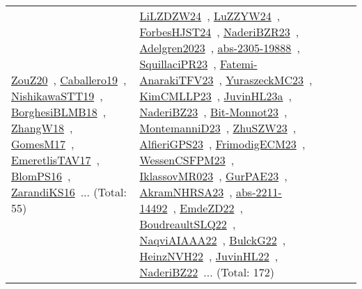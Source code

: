 {\begin{longtable}{lp{3cm}>{\raggedright\arraybackslash}p{6cm}>{\raggedright\arraybackslash}p{6cm}>{\raggedright\arraybackslash}p{8cm}}
\href{../works/ZouZ20.pdf}{ZouZ20}~\cite{ZouZ20}, \href{../works/Caballero19.pdf}{Caballero19}~\cite{Caballero19}, \href{../works/NishikawaSTT19.pdf}{NishikawaSTT19}~\cite{NishikawaSTT19}, \href{../works/BorghesiBLMB18.pdf}{BorghesiBLMB18}~\cite{BorghesiBLMB18}, \href{../works/ZhangW18.pdf}{ZhangW18}~\cite{ZhangW18}, \href{../works/GomesM17.pdf}{GomesM17}~\cite{GomesM17}, \href{../works/EmeretlisTAV17.pdf}{EmeretlisTAV17}~\cite{EmeretlisTAV17}, \href{../works/BlomPS16.pdf}{BlomPS16}~\cite{BlomPS16}, \href{../works/ZarandiKS16.pdf}{ZarandiKS16}~\cite{ZarandiKS16}... (Total: 55) & \href{../works/LiLZDZW24.pdf}{LiLZDZW24}~\cite{LiLZDZW24}, \href{../works/LuZZYW24.pdf}{LuZZYW24}~\cite{LuZZYW24}, \href{../works/ForbesHJST24.pdf}{ForbesHJST24}~\cite{ForbesHJST24}, \href{../works/NaderiBZR23.pdf}{NaderiBZR23}~\cite{NaderiBZR23}, \href{../works/Adelgren2023.pdf}{Adelgren2023}~\cite{Adelgren2023}, \href{../works/abs-2305-19888.pdf}{abs-2305-19888}~\cite{abs-2305-19888}, \href{../works/SquillaciPR23.pdf}{SquillaciPR23}~\cite{SquillaciPR23}, \href{../works/Fatemi-AnarakiTFV23.pdf}{Fatemi-AnarakiTFV23}~\cite{Fatemi-AnarakiTFV23}, \href{../works/YuraszeckMC23.pdf}{YuraszeckMC23}~\cite{YuraszeckMC23}, \href{../works/KimCMLLP23.pdf}{KimCMLLP23}~\cite{KimCMLLP23}, \href{../works/JuvinHL23a.pdf}{JuvinHL23a}~\cite{JuvinHL23a}, \href{../works/NaderiBZ23.pdf}{NaderiBZ23}~\cite{NaderiBZ23}, \href{../works/Bit-Monnot23.pdf}{Bit-Monnot23}~\cite{Bit-Monnot23}, \href{../works/MontemanniD23.pdf}{MontemanniD23}~\cite{MontemanniD23}, \href{../works/ZhuSZW23.pdf}{ZhuSZW23}~\cite{ZhuSZW23}, \href{../works/AlfieriGPS23.pdf}{AlfieriGPS23}~\cite{AlfieriGPS23}, \href{../works/FrimodigECM23.pdf}{FrimodigECM23}~\cite{FrimodigECM23}, \href{../works/WessenCSFPM23.pdf}{WessenCSFPM23}~\cite{WessenCSFPM23}, \href{../works/IklassovMR023.pdf}{IklassovMR023}~\cite{IklassovMR023}, \href{../works/GurPAE23.pdf}{GurPAE23}~\cite{GurPAE23}, \href{../works/AkramNHRSA23.pdf}{AkramNHRSA23}~\cite{AkramNHRSA23}, \href{../works/abs-2211-14492.pdf}{abs-2211-14492}~\cite{abs-2211-14492}, \href{../works/EmdeZD22.pdf}{EmdeZD22}~\cite{EmdeZD22}, \href{../works/BoudreaultSLQ22.pdf}{BoudreaultSLQ22}~\cite{BoudreaultSLQ22}, \href{../works/NaqviAIAAA22.pdf}{NaqviAIAAA22}~\cite{NaqviAIAAA22}, \href{../works/BulckG22.pdf}{BulckG22}~\cite{BulckG22}, \href{../works/HeinzNVH22.pdf}{HeinzNVH22}~\cite{HeinzNVH22}, \href{../works/JuvinHL22.pdf}{JuvinHL22}~\cite{JuvinHL22}, \href{../works/NaderiBZ22.pdf}{NaderiBZ22}~\cite{NaderiBZ22}... (Total: 172)\\

\end{longtable}}
